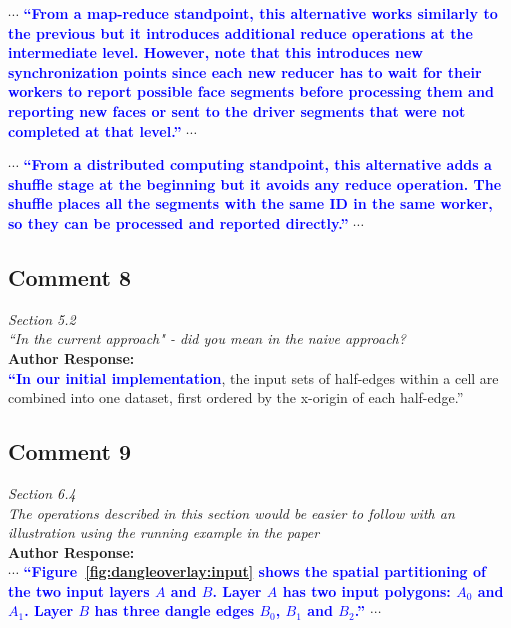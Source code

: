 \documentclass[10pt]{article}
\begin{document}
$\cdots$
\textbf{\textcolor{blue}{``From a map-reduce standpoint, this alternative works similarly to the previous but it introduces additional reduce operations at the intermediate level.  However, note that this introduces new synchronization points since each new reducer has to wait for their workers to report possible face segments before processing them and reporting new faces or sent to the driver segments that were not completed at that level.''}}
$\cdots$

$\cdots$
\textbf{\textcolor{blue}{``From a distributed computing standpoint, this alternative adds a shuffle stage at the beginning but it avoids any reduce operation.  The shuffle places all the segments with the same ID in the same worker, so they can be processed and reported directly.''}}
$\cdots$

\subsection*{Comment 8}
\textit{
Section 5.2\\
``In the current approach" - did you mean in the naive approach?
} \\

\textbf{Author Response:}\\
\textbf{\textcolor{blue}{
``In our initial implementation}},
the input sets of half-edges within a cell are combined into one dataset, first ordered by the x-origin of each half-edge.''

\subsection*{Comment 9}
\textit{
Section 6.4\\
The operations described in this section would be easier to follow with an illustration using the running example in the paper
} \\

\textbf{Author Response:}\\
$\cdots$
\textbf{\textcolor{blue}{
``Figure~\ref{fig:dangleoverlay:input} shows the spatial partitioning of the two input layers $A$ and $B$. Layer $A$ has two input polygons: $A_0$ and $A_1$. Layer $B$ has three dangle edges $B_0$, $B_1$ and $B_2$.''
}}
$\cdots$
\end{document}
